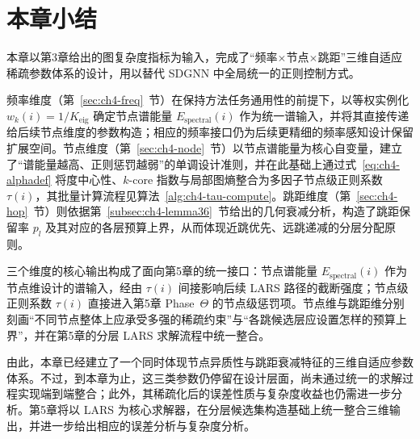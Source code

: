 \section{本章小结}
\label{sec:ch4-summary}

本章以第3章给出的图复杂度指标为输入，完成了“频率\(\times\)节点\(\times\)跳距”三维自适应稀疏参数体系的设计，用以替代 SDGNN 中全局统一的正则控制方式。

频率维度（第~\ref{sec:ch4-freq}~节）在保持方法任务通用性的前提下，以等权实例化
\(
w_k(i)=1/K_{\text{eig}}
\)
确定节点谱能量
\(
E_{\text{spectral}}(i)
\)
作为统一谱输入，并将其直接传递给后续节点维度的参数构造；相应的频率接口仍为后续更精细的频率感知设计保留扩展空间。节点维度（第~\ref{sec:ch4-node}~节）以节点谱能量为核心自变量，建立了“谱能量越高、正则惩罚越弱”的单调设计准则，并在此基础上通过式~\eqref{eq:ch4-alphadef} 将度中心性、\(k\)-core 指数与局部图熵整合为多因子节点级正则系数 \(\tau(i)\)，其批量计算流程见算法~\ref{alg:ch4-tau-compute}。跳距维度（第~\ref{sec:ch4-hop}~节）则依据第~\ref{subsec:ch4-lemma36}~节给出的几何衰减分析，构造了跳距保留率 \(p_l\) 及其对应的各层预算上界，从而体现近跳优先、远跳递减的分层分配原则。

三个维度的核心输出构成了面向第5章的统一接口：节点谱能量
\(
E_{\text{spectral}}(i)
\)
作为节点维设计的谱输入，经由 \(\tau(i)\) 间接影响后续 LARS 路径的截断强度；节点级正则系数 \(\tau(i)\) 直接进入第5章 Phase~\(\Theta\) 的节点级惩罚项。节点维与跳距维分别刻画“不同节点整体上应承受多强的稀疏约束”与“各跳候选层应设置怎样的预算上界”，并在第5章的分层 LARS 求解流程中统一整合。

由此，本章已经建立了一个同时体现节点异质性与跳距衰减特征的三维自适应参数体系。不过，到本章为止，这三类参数仍停留在设计层面，尚未通过统一的求解过程实现端到端整合；此外，其稀疏化后的误差性质与复杂度收益也仍需进一步分析。第5章将以 LARS 为核心求解器，在分层候选集构造基础上统一整合三维输出，并进一步给出相应的误差分析与复杂度分析。

